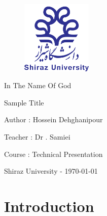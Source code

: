 \documentclass[12pt , a4paper]{article}
\title{\normalfont{Neural Networks}}
\author{Hossein Dehghanipour}
\date{\today}
\newcommand{\thedate}{\today}
\begin{document}
\thispagestyle{empty}
 \begin{center}
\begin{figure}[H]
\centering
\includegraphics[width=0.3\textwidth]{shirazuLogo.png}
\caption*{}
\label{f-0-0}
\end{figure}

{
\centering
{}  
\fontsize{16pt}{16pt}
\selectfont 
In The Name Of God
}

{
\centering
{}  
\fontsize{14pt}{14pt}
\selectfont 
Sample Title
}

{
\centering
{}  
\fontsize{12pt}{12pt}
\selectfont 
Author : Hossein Dehghanipour
}

{
\centering
{}  
\fontsize{12pt}{12pt}
\selectfont 
Teacher : Dr . Samiei
}

{
\centering
{}  
\fontsize{12pt}{12pt}
\selectfont 
Course : Technical Presentation 
}

{
\centering
{}  
\fontsize{12pt}{12pt}
\selectfont 
Shiraz University - \thedate
}

\end{center}
 

 
\setmainfont{Times New Roman}
\cleardoublepage
\tableofcontents
\cleardoublepage

\section { Introduction } 


\cleardoublepage

\end{document}
